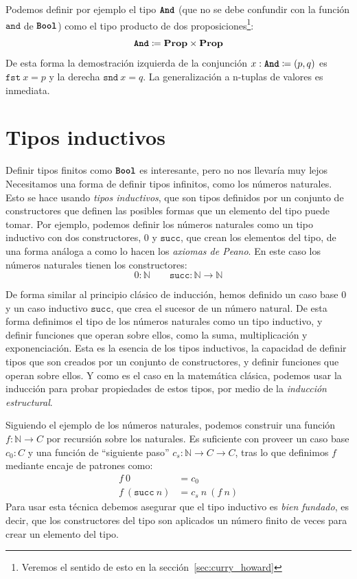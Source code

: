 \documentclass[
  a4paper, 
  10pt, 
  parskip=half, 
  toc=bibliography,
]{scrbook}
\theoremstyle{definition}
\theoremstyle{bolddef}
\newcommand{\funfont}[1]{\texttt{#1}}
\newcommand{\tyfont}[1]{\texttt{\textbf{#1}}}
\newcommand{\Prop}{\mathbf{Prop}}
\begin{document}
Podemos definir por ejemplo el tipo \(\tyfont{And}\) (que no se debe confundir
con la función \(\funfont{and}\) de \(\tyfont{Bool}\)) como el tipo producto de dos 
proposiciones\footnote{Veremos el sentido de esto en la sección~\ref{sec:curry_howard}}:
\[
  \tyfont{And} \coloneqq \Prop \times \Prop
\]
De esta forma la demostración izquierda de la conjunción 
\(x : \tyfont{And} \coloneqq (p, q)\) es \(\funfont{fst} \ x = p\)
y la derecha \(\funfont{snd} \ x = q\). La generalización a n-tuplas de
valores es inmediata.

\section{Tipos inductivos}

Definir tipos finitos como \(\tyfont{Bool}\) es interesante, pero no nos
llevaría muy lejos Necesitamos una forma de definir tipos infinitos, como los
números naturales. Esto se hace usando \emph{tipos inductivos}, que son tipos
definidos por un conjunto de constructores que definen las posibles formas que
un elemento del tipo puede tomar. Por ejemplo, podemos definir los números
naturales como un tipo inductivo con dos constructores, \(0\) y
\(\funfont{succ}\), que crean los elementos del tipo, de una forma análoga a como 
lo hacen los \emph{axiomas de Peano}. En este caso los números naturales tienen los
constructores:
\[
  0 : \mathbb{N} \qquad \funfont{succ}: \mathbb{N} \to \mathbb{N}
\]

De forma similar al principio clásico de inducción, hemos definido un caso base
\(0\) y un caso inductivo \(\funfont{succ}\), que crea el sucesor de un número
natural. De esta forma definimos el tipo de los números naturales como un tipo
inductivo, y definir funciones que operan sobre ellos, como la suma,
multiplicación y exponenciación. Esta es la esencia de los tipos inductivos, la
capacidad de definir tipos que son creados por un conjunto de constructores, y
definir funciones que operan sobre ellos. Y como es el caso en la matemática
clásica, podemos usar la inducción para probar propiedades de estos tipos, por 
medio de la \emph{inducción estructural}.

Siguiendo el ejemplo de los números naturales, podemos construir una función
\(f: \mathbb{N} \to C\) por recursión sobre los naturales. Es suficiente con
proveer un caso base \(c_0 : C\) y una función de \enquote{siguiente paso}
\(c_s: \mathbb{N} \to C \to C\), tras lo que definimos \(f\) mediante encaje de
patrones como:
\begin{align*}
  f \ 0 & = c_0 \\
  f \ (\funfont{succ} \ n) & = c_s \ n \ (f \ n)
\end{align*}
Para usar esta técnica debemos asegurar que el tipo inductivo es \emph{bien fundado},
es decir, que los constructores del tipo son aplicados un número finito de veces
para crear un elemento del tipo.
\end{document}
